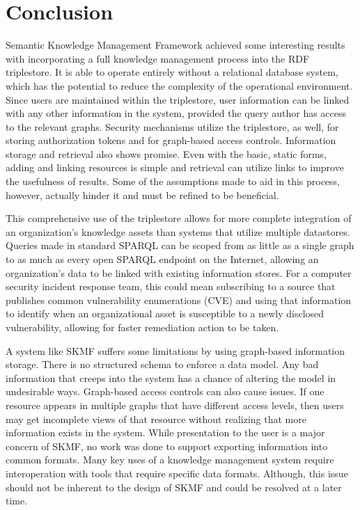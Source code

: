 \chapter{Conclusion}
\label{concl}

Semantic Knowledge Management Framework achieved some interesting results with incorporating a full knowledge management process into the RDF triplestore. It is able to operate entirely without a relational database system, which has the potential to reduce the complexity of the operational environment. Since users are maintained within the triplestore, user information can be linked with any other information in the system, provided the query author has access to the relevant graphs. Security mechanisms utilize the triplestore, as well, for storing authorization tokens and for graph-based access controls. Information storage and retrieval also shows promise. Even with the basic, static forms, adding and linking resources is simple and retrieval can utilize links to improve the usefulness of results. Some of the assumptions made to aid in this process, however, actually hinder it and must be refined to be beneficial.

This comprehensive use of the triplestore allows for more complete integration of an organization's knowledge assets than systems that utilize multiple datastores. Queries made in standard SPARQL can be scoped from as little as a single graph to as much as every open SPARQL endpoint on the Internet, allowing an organization's data to be linked with existing information stores. For a computer security incident response team, this could mean subscribing to a source that publishes common vulnerability enumerations (CVE) and using that information to identify when an organizational asset is susceptible to a newly disclosed vulnerability, allowing for faster remediation action to be taken.

A system like SKMF suffers some limitations by using graph-based information storage. There is no structured schema to enforce a data model. Any bad information that creeps into the system has a chance of altering the model in undesirable ways. Graph-based access controls can also cause issues. If one resource appears in multiple graphs that have different access levels, then users may get incomplete views of that resource without realizing that more information exists in the system. While presentation to the user is a major concern of SKMF, no work was done to support exporting information into common formats. Many key uses of a knowledge management system require interoperation with tools that require specific data formats. Although, this issue should not be inherent to the design of SKMF and could be resolved at a later time.

